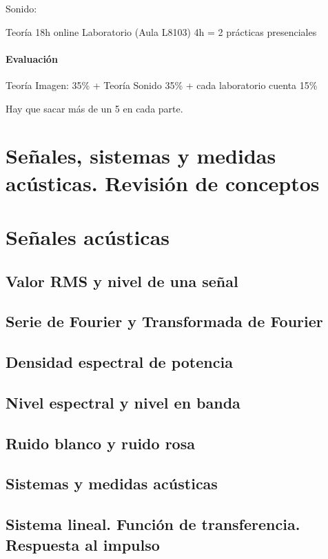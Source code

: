\documentclass[a4paper]{book}
\begin{document}
Sonido:

Teoría 18h online
Laboratorio (Aula L8103) 4h = 2 prácticas presenciales

\subsubsection{Evaluación}
Teoría Imagen: 35\% + Teoría Sonido 35\% + cada laboratorio cuenta 15\%

Hay que sacar más de un 5 en cada parte.

\newpage

\setlength{\parskip}{0em}
\tableofcontents 
\setlength{\parskip}{0.5em}

\chapter{Señales, sistemas y medidas acústicas. Revisión de conceptos}

\chapter{Señales acústicas}
\section{Valor RMS y nivel de una señal}
\section{Serie de Fourier y Transformada de Fourier}
\section{Densidad espectral de potencia}
\section{Nivel espectral y nivel en banda}
\section{Ruido blanco y ruido rosa}
\section{Sistemas y medidas acústicas}
\section{Sistema lineal. Función de transferencia. Respuesta al impulso}
\end{document}

